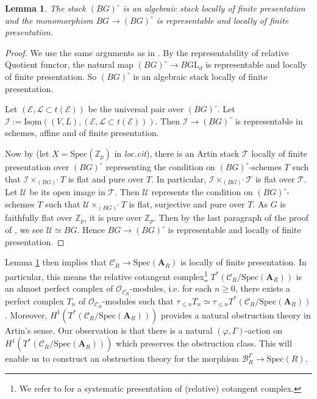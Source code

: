\documentclass[10pt]{article}
\newtheorem{lem}[thm]{Lemma}
\numberwithin{equation}{section}
\newcommand{\bZ}{{\mathbb Z}}
\newcommand{\calB}{{\mathcal B}}
\newcommand{\calC}{{\mathcal C}}
\newcommand{\calE}{{\mathcal E}}
\newcommand{\calI}{{\mathcal I}}
\newcommand{\calL}{{\mathcal L}}
\newcommand{\calO}{{\mathcal O}}
\newcommand{\calT}{{\mathcal T}}
\newcommand{\calU}{{\mathcal U}}
\newcommand{\Isom}{{\mathrm{Isom}}}         %
\newcommand{\Spec}{{\mathrm{Spec}}}         %
\newcommand{\GL}{{\mathrm{GL}}}             %
\newcommand{\bfA}{{\textbf{A}}}
\begin{document}
\begin{lem}\label{BG-BGo}
    The stack $(BG)^{\circ}$ is an algebraic stack locally of finite presentation and the monomorphism $BG\to (BG)^{\circ}$ is representable and locally of finite presentation. 
    \end{lem}
    


\begin{proof}
    We use the same arguments as in \cite[Section 2]{Bro13}. By the representability of relative Quotient functor, the natural map $(BG)^{\circ}\to B\GL_{d}$ is representable and locally of finite presentation. So $(BG)^{\circ}$ is an algebraic stack locally of finite presentation.
    
    Let  $(\calE,\calL\subset t(\calE))$ be the universal pair over $(BG)^{\circ}$. Let $\calI:=\underline\Isom((V,L),(\calE,\calL\subset t(\calE)))$. Then $\calI\to (BG)^{\circ}$ is representable in schemes, affine and of finite presentation.

     Now by \cite[lemma 2.5]{Bro13} (let $X=\Spec(\bZ_p)$ in \textit{loc.cit}), there is an Artin stack $\calT$ locally of finite presentation over $(BG)^{\circ}$ representing the condition on $(BG)^{\circ}$-schemes $T$ such that $\calI\times_{(BG)^{\circ}}T$ is flat and pure over $T$. In particular, $\calI\times_{(BG)^{\circ}}\calT$ is flat over $\calT$. Let $\calU$ be its open image in $\calT$. Then $\calU$ represents the condition on $(BG)^{\circ}$-schemes $T$ such that $\calU\times_{(BG)^{\circ}}T$ is flat, surjective and pure over $T$. As $G$ is faithfully flat over $\bZ_p$, it is pure over $\bZ_p$. Then by the last paragraph of the proof of \cite[Lemma 2.1]{Bro13}, we see $\calU\simeq BG$. Hence $BG\to (BG)^{\circ}$ is representable and locally of finite presentation.
\end{proof}
Lemma \ref{BG-BGo} then implies that $\calC_R\to \Spec(\bfA_R)$ is locally of finite presentation. In particular, this means the relative cotangent complex\footnote{We refer to \cite[Chapter 1]{GR17} for a systematic presentation of (relative) cotangent complex.} $T^*(\calC_R/\Spec(\bfA_R))$ is an almost perfect complex of $\calO_{\calC_R}$-modules, i.e. for each $n\geq 0$, there exists a perfect complex $T_n$ of $\calO_{\calC_R}$-modules such that $\tau_{\leq n}T_n\simeq \tau_{\leq n}T^*(\calC_R/\Spec(\bfA_R))$. Moreover, $H^1(T^*(\calC_R/\Spec(\bfA_R)))$ provides a natural obstruction theory in Artin's sense. Our observation is that there is a natural $(\varphi,\Gamma)$-action on $H^1(T^*(\calC_R/\Spec(\bfA_R)))$ which preserves the obstruction class. This will enable us to construct an obstruction theory for the morphism $\calB_R^{\Gamma}\to \Spec(R)$.
\end{document}
